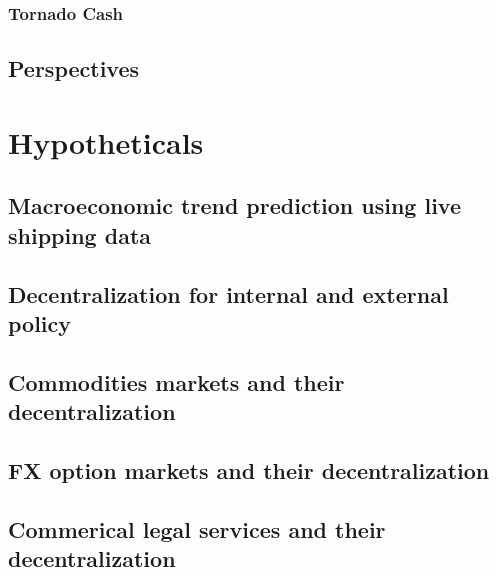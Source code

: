\documentclass[11pt]{article}
\begin{document}
\subsubsection{Tornado Cash~\cite{nadler_2023_tornado}~\cite{pertsev_2019_tornado}}
\subsection{Perspectives}


\section{Hypotheticals}
\subsection{Macroeconomic trend prediction using live shipping data}
\subsection{Decentralization for internal and external policy}
\subsection{Commodities markets and their decentralization}
\subsection{FX option markets and their decentralization}
\subsection{Commerical legal services and their decentralization}

\newpage
\printbibliography
{}
\end{document}
